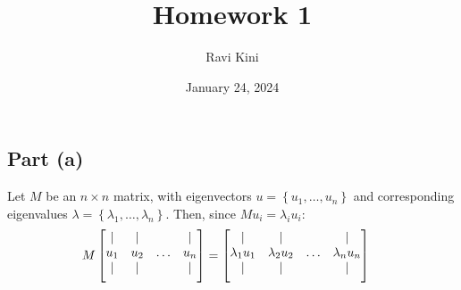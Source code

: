 \documentclass{article}
\title{Homework 1}
\author{Ravi Kini}
\date{January 24, 2024}
\begin{document}
\maketitle

\problem
\subsection*{Part (a)}
Let $M$ be an $n \times n$ matrix, with eigenvectors $u = \left\{u_1, \ldots, u_n\right\}$ and corresponding eigenvalues $\lambda = \left\{\lambda_1, \ldots, \lambda_n\right\}$. Then, since $Mu_i = \lambda_iu_i$:
\begin{equation}
    \begin{split}
        M\begin{bmatrix}\vert & \vert &  & \vert \\u_1 &  u_2 & \hdots &  u_n\\\vspace{.15 cm}\vert & \vert &  & \vert\end{bmatrix} & = \begin{bmatrix}\vert & \vert &  & \vert \\\lambda_1u_1 &  \lambda_2u_2 & \hdots &  \lambda_nu_n\\\vspace{.15 cm}\vert & \vert &  & \vert\end{bmatrix}
    \end{split}
\end{equation}
\end{document}
